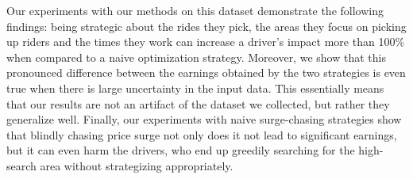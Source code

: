 Our experiments with our methods on this dataset demonstrate the following findings:
being strategic about the rides they pick, the areas they focus on picking up riders
and the times they work can increase a driver's impact more than 100\%  when compared
to a naive optimization strategy.
Moreover, we show that this pronounced difference between the earnings obtained by the 
two strategies is even true when there is large uncertainty in the input data. This essentially means that our results are not an artifact of the dataset we collected, but rather they generalize well.
Finally, our experiments with naive surge-chasing strategies show that blindly chasing price surge not only does it not lead to significant earnings, but it can even harm the drivers, who end up greedily searching for the high-search area without strategizing appropriately.